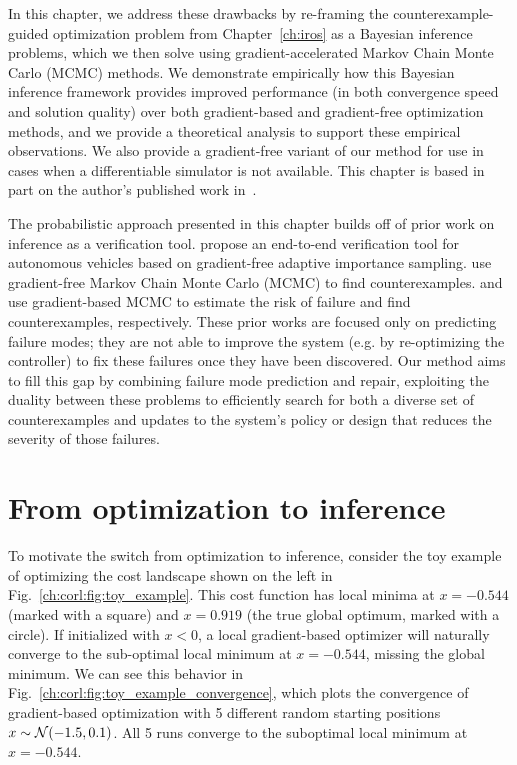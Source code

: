 In this chapter, we address these drawbacks by re-framing the counterexample-guided optimization problem from Chapter~\ref{ch:iros} as a Bayesian inference problems, which we then solve using gradient-accelerated Markov Chain Monte Carlo (MCMC) methods. We demonstrate empirically how this Bayesian inference framework provides improved performance (in both convergence speed and solution quality) over both gradient-based and gradient-free optimization methods, and we provide a theoretical analysis to support these empirical observations. We also provide a gradient-free variant of our method for use in cases when a differentiable simulator is not available. This chapter is based in part on the author's published work in~\cite{dawsonBayesianApproachBreaking2023}.

The probabilistic approach presented in this chapter builds off of prior work on inference as a verification tool. \cite{okellyScalableEndtoEndAutonomous2018} propose an end-to-end verification tool for autonomous vehicles based on gradient-free adaptive importance sampling. \cite{zhouRoCUSRobotController2021} use gradient-free Markov Chain Monte Carlo (MCMC) to find counterexamples. \cite{sinhaNeuralBridgeSampling2020} and \cite{deleckiModelbasedValidationProbabilistic2023a} use gradient-based MCMC to estimate the risk of failure and find counterexamples, respectively.
%
These prior works are focused only on predicting failure modes; they are not able to improve the system (e.g. by re-optimizing the controller) to fix these failures once they have been discovered. Our method aims to fill this gap by combining failure mode prediction and repair, exploiting the duality between these problems to efficiently search for both a diverse set of counterexamples and updates to the system's policy or design that reduces the severity of those failures.

\section{From optimization to inference}

To motivate the switch from optimization to inference, consider the toy example of optimizing the cost landscape shown on the left in Fig.~\ref{ch:corl:fig:toy_example}. This cost function has local minima at $x = -0.544$ (marked with a square) and $x = 0.919$ (the true global optimum, marked with a circle). If initialized with $x < 0$, a local gradient-based optimizer will naturally converge to the sub-optimal local minimum at $x = -0.544$, missing the global minimum. We can see this behavior in Fig.~\ref{ch:corl:fig:toy_example_convergence}, which plots the convergence of gradient-based optimization with 5 different random starting positions $x\sim\mathcal{N}(-1.5, 0.1)$. All 5 runs converge to the suboptimal local minimum at $x = -0.544$.

